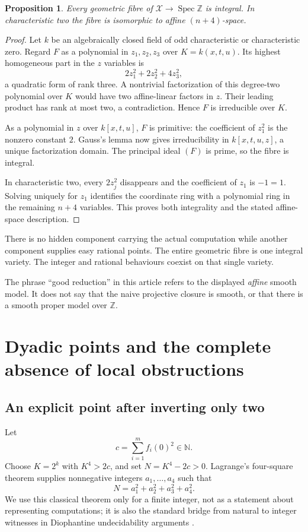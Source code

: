 \documentclass[11pt,a4paper]{article}
\newtheorem{proposition}[theorem]{Proposition}
\theoremstyle{definition}
\theoremstyle{remark}
\newcommand{\N}{\mathbb N}
\newcommand{\Z}{\mathbb Z}
\newcommand{\Spec}{\operatorname{Spec}}
\newcommand{\variety}{\mathcal X}
\begin{document}
\begin{proposition}\label{sdf:prop:integral}
Every geometric fibre of $\variety\to\Spec\Z$ is integral.
In characteristic two the fibre is isomorphic to affine $(n+4)$-space.
\end{proposition}
\begin{proof}
Let $k$ be an algebraically closed field of odd characteristic or
characteristic zero. Regard $F$ as a polynomial in $z_1,z_2,z_3$ over
$K=k(x,t,u)$. Its highest homogeneous part in the $z$ variables is
\[
 2z_1^2+2z_2^2+4z_3^2,
\]
a quadratic form of rank three. A nontrivial factorization of this
degree-two polynomial over $K$ would have two affine-linear factors in
$z$. Their leading product has rank at most two, a contradiction.
Hence $F$ is irreducible over $K$.

As a polynomial in $z$ over $k[x,t,u]$, $F$ is primitive: the coefficient
of $z_1^2$ is the nonzero constant $2$. Gauss's lemma now gives
irreducibility in $k[x,t,u,z]$, a unique factorization domain. The
principal ideal $(F)$ is prime, so the fibre is integral.

In characteristic two, every $2z_j^2$ disappears and the coefficient of
$z_1$ is $-1=1$. Solving uniquely for $z_1$ identifies the coordinate ring
with a polynomial ring in the remaining $n+4$ variables. This proves both
integrality and the stated affine-space description.
\end{proof}

There is no hidden component carrying the actual computation while another
component supplies easy rational points. The entire geometric fibre is one
integral variety. The integer and rational behaviours coexist on that single
variety.

The phrase ``good reduction'' in this article refers to the displayed
\emph{affine} smooth model. It does not say that the naive projective closure
is smooth, or that there is a smooth proper model over $\Z$.

\section{Dyadic points and the complete absence of local obstructions}\label{sdf:sec:local}

\subsection{An explicit point after inverting only two}

Let
\begin{equation}\label{sdf:eq:c}
 c=\sum_{i=1}^m f_i(0)^2\in\N.
\end{equation}
Choose $K=2^k$ with $K^4>2c$, and set $N=K^4-2c>0$.
Lagrange's four-square theorem supplies nonnegative integers
$a_1,\ldots,a_4$ such that
\begin{equation}\label{sdf:eq:four-square}
 N=a_1^2+a_2^2+a_3^2+a_4^2.
\end{equation}
We use this classical theorem only for a finite integer, not as a statement
about representing computations; it is also the standard bridge from
natural to integer witnesses in Diophantine undecidability arguments
\cite[Section 5]{poonen}.
\end{document}
